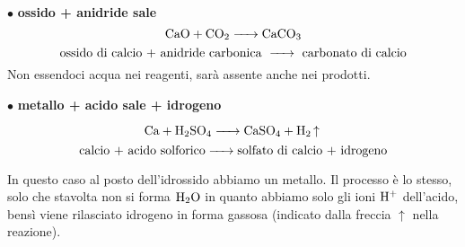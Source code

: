 \vspace{0.2cm}$\bullet$ \textbf{ ossido + anidride \ce{->} sale}
$$\ce{CaO + CO_2 -> CaCO_3}$$
$$\text{ossido di calcio + anidride carbonica \ce{->} carbonato di calcio}$$
Non essendoci acqua nei reagenti, sarà assente anche nei prodotti.

\vspace{0.2cm}$\bullet$ \textbf{ metallo + acido \ce{->} sale + idrogeno}

$$\ce{Ca + H_2SO_4 -> CaSO_4 + H_2 ^}$$
$$\text{calcio + acido solforico\ce{->}solfato di calcio + idrogeno}$$

In questo caso al posto dell'idrossido abbiamo un metallo. Il processo è lo stesso, solo che stavolta non si forma $\rm H_2O$ in quanto abbiamo solo gli ioni $\rm H^+$ dell'acido, bensì viene rilasciato idrogeno in forma gassosa (indicato dalla freccia $\uparrow$ nella reazione).